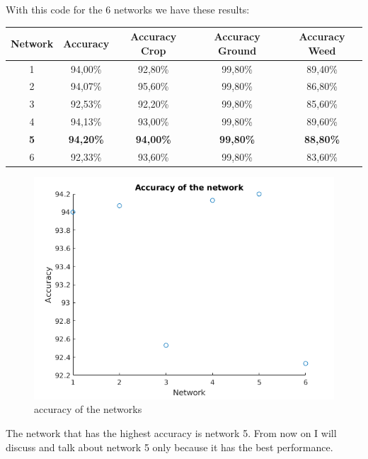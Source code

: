 \documentclass[]{report}
\begin{document}
With this code for the 6 networks we have these results:

\begin{table}[h]
\centering

\begin{tabular}{|c|c|c|c|c|}
 \hline
 \textbf{Network} & \textbf{Accuracy} & \textbf{Accuracy Crop} & \textbf{Accuracy Ground} & \textbf{Accuracy Weed} \\ \hline
 1 & 94,00\% & 92,80\%  & 99,80\%  & 89,40\%  \\ \hline
 2 & 94,07\% & 95,60\%  & 99,80\%  & 86,80\%  \\ \hline
 3 & 92,53\% & 92,20\%  & 99,80\%  & 85,60\%  \\ \hline
 4 & 94,13\% & 93,00\%  & 99,80\%  & 89,60\%  \\ \hline
 \textbf{5} & \textbf{94,20\%} & \textbf{94,00\%}  & \textbf{99,80\%}  & \textbf{88,80\%}  \\ \hline
 6 & 92,33\% & 93,60\%  & 99,80\%  & 83,60\%  \\ \hline
\end{tabular}
\end{table}

\begin{figure}[h]
	\begin{center}
		\includegraphics[scale=0.6]{accuracy.png}
		\caption{accuracy of the networks}
		\label{fig:accuracyNetworks}
	\end{center}
\end{figure}

The network that has the highest accuracy is network 5. From now on I will discuss and talk about network 5 only because it has the best performance. 
\end{document}
